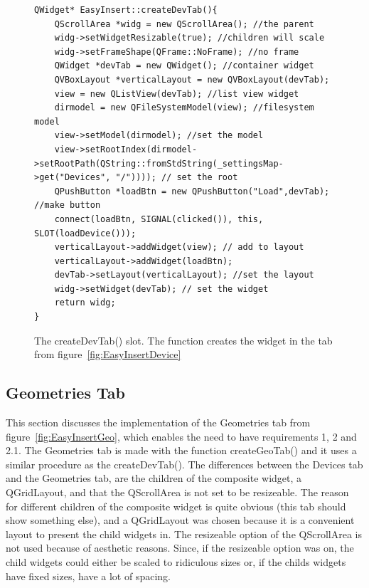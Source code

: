 \begin{figure}[h] %
\centering
\lstset{language=C++} 
\begin{lstlisting}[frame=single]  
QWidget* EasyInsert::createDevTab(){
	QScrollArea *widg = new QScrollArea(); //the parent 
	widg->setWidgetResizable(true); //children will scale 
	widg->setFrameShape(QFrame::NoFrame); //no frame 
	QWidget *devTab = new QWidget(); //container widget
	QVBoxLayout *verticalLayout = new QVBoxLayout(devTab); 
	view = new QListView(devTab); //list view widget
	dirmodel = new QFileSystemModel(view); //filesystem model
	view->setModel(dirmodel); //set the model
	view->setRootIndex(dirmodel->setRootPath(QString::fromStdString(_settingsMap->get("Devices", "/")))); // set the root
	QPushButton *loadBtn = new QPushButton("Load",devTab); //make button
	connect(loadBtn, SIGNAL(clicked()), this, SLOT(loadDevice())); 
	verticalLayout->addWidget(view); // add to layout
	verticalLayout->addWidget(loadBtn);
	devTab->setLayout(verticalLayout); //set the layout
	widg->setWidget(devTab); // set the widget
	return widg;
}
\end{lstlisting}
\caption{The createDevTab() slot. The function creates the widget in the tab from figure~\ref{fig:EasyInsertDevice}}
\label{fig:deviceTabCode} 	
\end{figure}

\subsection{Geometries Tab}
\label{sec:GeoTab}
This section discusses the implementation of the Geometries tab from figure~\ref{fig:EasyInsertGeo}, which enables the need to have requirements 1, 2 and 2.1. The Geometries tab is made with the function createGeoTab() and it uses a similar procedure as the createDevTab(). The differences between the Devices tab and the Geometries tab, are the children of the composite widget, a QGridLayout, and that the QScrollArea is not set to be resizeable. The reason for different children of the composite widget is quite obvious (this tab should show something else), and a QGridLayout was chosen because it is a convenient layout to present the child widgets in. The resizeable option of the QScrollArea is not used because of aesthetic reasons. Since, if the resizeable option was on, the child widgets could either be scaled to ridiculous sizes or, if the childs widgets have fixed sizes, have a lot of spacing. 

